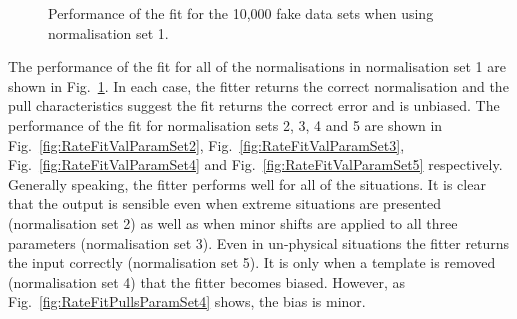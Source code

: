 \begin{figure}%
  \centering
  \caption{Performance of the fit for the 10,000 fake data sets when using normalisation set 1.}
  \label{fig:RateFitValParamSet1}
\end{figure}
The performance of the fit for all of the normalisations in normalisation set 1 are shown in Fig.~\ref{fig:RateFitValParamSet1}.  In each case, the fitter returns the correct normalisation and the pull characteristics suggest the fit returns the correct error and is unbiased.  The performance of the fit for normalisation sets 2, 3, 4 and 5 are shown in Fig.~\ref{fig:RateFitValParamSet2}, Fig.~\ref{fig:RateFitValParamSet3}, Fig.~\ref{fig:RateFitValParamSet4} and Fig.~\ref{fig:RateFitValParamSet5} respectively.  Generally speaking, the fitter performs well for all of the situations.  It is clear that the output is sensible even when extreme situations are presented (normalisation set 2) as well as when minor shifts are applied to all three parameters (normalisation set 3).  Even in un-physical situations the fitter returns the input correctly (normalisation set 5).  It is only when a template is removed (normalisation set 4) that the fitter becomes biased.  However, as Fig.~\ref{fig:RateFitPullsParamSet4} shows, the bias is minor.
